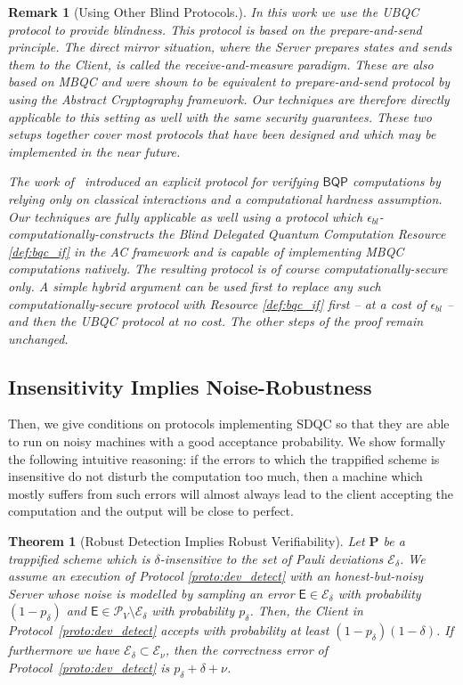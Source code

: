\documentclass[12pt]{iopart}
\newcommand{\cptp}[1]{\mathsf{#1}} \newcommand{\pd}[1]{\mathcal{#1}}  \newcommand{\sch}[1]{\bm{#1}}
\renewcommand{\1}{\mathds{1}}
\newtheorem{theorem}{Theorem}
\newtheorem{remark}{Remark}
\begin{document}
\begin{remark}[Using Other Blind Protocols.]
In this work we use the UBQC protocol to provide blindness. This protocol is based on the \emph{prepare-and-send} principle. 
The direct mirror situation, where the Server prepares states and sends them to the Client, is called the \emph{receive-and-measure} paradigm. These are also based on MBQC and were shown to be equivalent to prepare-and-send protocol by \cite{WEP22:equivalence} using the Abstract Cryptography framework. Our techniques are therefore directly applicable to this setting as well with the same security guarantees. These two setups together cover most protocols that have been designed and which may be implemented in the near future.

The work of~\cite{M18:classical} introduced an explicit protocol for verifying $\mathsf{BQP}$ computations by relying only on classical interactions and a computational hardness assumption.
Our techniques are fully applicable as well using a protocol which \emph{$\epsilon_{bl}$-computationally-constructs} the Blind Delegated Quantum Computation Resource \ref{def:bqc_if} in the AC framework and is capable of implementing MBQC computations natively. The resulting protocol is of course computationally-secure only. A simple hybrid argument can be used first to replace any such computationally-secure protocol with Resource \ref{def:bqc_if} first -- at a cost of $\epsilon_{bl}$ -- and then the UBQC protocol at no cost. The other steps of the proof remain unchanged.
\end{remark}

\subsection{Insensitivity Implies Noise-Robustness}
Then, we give conditions on protocols implementing SDQC so that they are able to run on noisy machines with a good acceptance probability. We show formally the following intuitive reasoning: if the errors to which the trappified scheme is insensitive do not disturb the computation too much, then a machine which mostly suffers from such errors will almost always lead to the client accepting the computation and the output will be close to perfect.

\begin{theorem}[Robust Detection Implies Robust Verifiability]
\label{thm:robust_verif}
  Let $\sch P$ be a trappified scheme which is $\delta$-insensitive to the set of Pauli deviations $\mathcal{E}_\delta$.
  We assume an execution of Protocol \ref{proto:dev_detect} with an honest-but-noisy Server whose noise is modelled by sampling an error $\cptp E \in \mathcal E_\delta$ with probability $(1-p_\delta)$ and $\cptp E \in \mathcal P_V \setminus \mathcal E_\delta$ with probability $p_\delta$. 
  Then, the Client in Protocol~\ref{proto:dev_detect} accepts with probability at least $(1-p_\delta)(1-\delta)$.
  If furthermore we have $\mathcal{E}_\delta \subset \mathcal{E}_\nu$, then the correctness error of Protocol~\ref{proto:dev_detect} is $p_\delta + \delta + \nu$.
\end{theorem}
\end{document}
